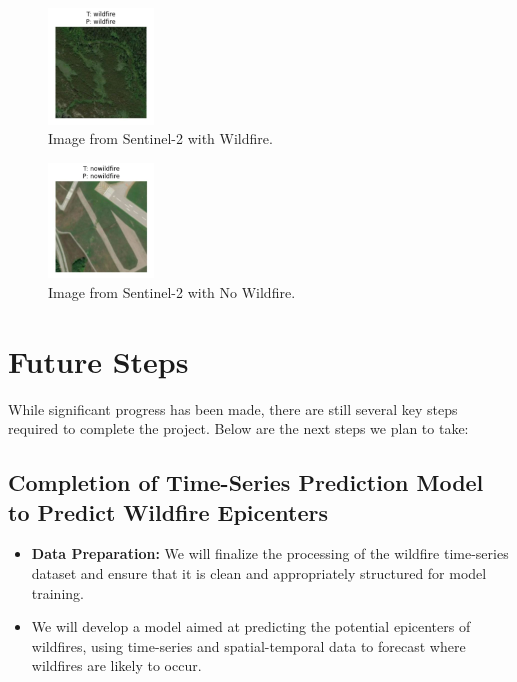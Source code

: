 \documentclass[conference]{IEEEtran}
\begin{document}
\begin{figure}[h!]
    \centering
    \includegraphics[width=0.25\textwidth]{w.jpeg}
    \caption{Image from Sentinel-2 with Wildfire.}
    \label{fig:your_image_label}
\end{figure}

\begin{figure}[h!]
    \centering
    \includegraphics[width=0.25\textwidth]{nw.jpeg}
    \caption{Image from Sentinel-2 with No Wildfire.}
    \label{fig:your_image_label}
\end{figure}

\section{Future Steps}

While significant progress has been made, there are still several key steps required to complete the project. Below are the next steps we plan to take:

\subsection{Completion of Time-Series Prediction Model to Predict Wildfire Epicenters}
\begin{itemize}
    \item \textbf{Data Preparation:} We will finalize the processing of the wildfire time-series dataset and ensure that it is clean and appropriately structured for model training.

    \item We will develop a model aimed at predicting the potential epicenters of wildfires, using time-series and spatial-temporal data to forecast where wildfires are likely to occur.
\end{itemize}
\end{document}
